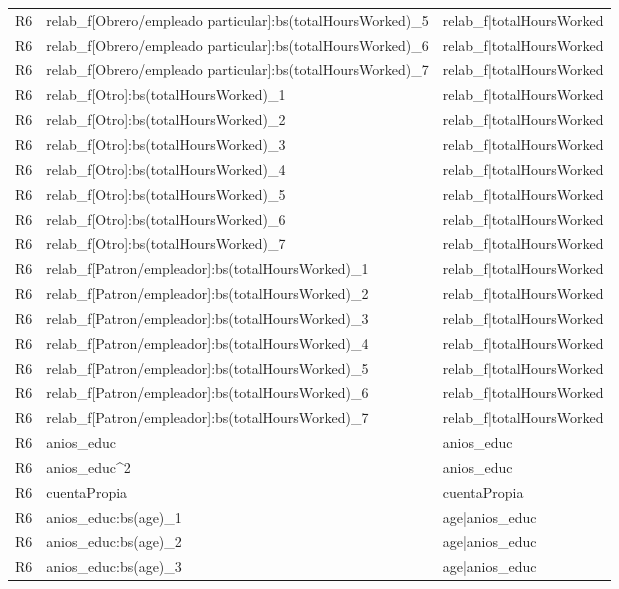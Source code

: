 \begin{longtable}{lll}
R6 & relab\_f[Obrero/empleado particular]:bs(totalHoursWorked)\_5 & relab\_f|totalHoursWorked \\
R6 & relab\_f[Obrero/empleado particular]:bs(totalHoursWorked)\_6 & relab\_f|totalHoursWorked \\
R6 & relab\_f[Obrero/empleado particular]:bs(totalHoursWorked)\_7 & relab\_f|totalHoursWorked \\
R6 & relab\_f[Otro]:bs(totalHoursWorked)\_1 & relab\_f|totalHoursWorked \\
R6 & relab\_f[Otro]:bs(totalHoursWorked)\_2 & relab\_f|totalHoursWorked \\
R6 & relab\_f[Otro]:bs(totalHoursWorked)\_3 & relab\_f|totalHoursWorked \\
R6 & relab\_f[Otro]:bs(totalHoursWorked)\_4 & relab\_f|totalHoursWorked \\
R6 & relab\_f[Otro]:bs(totalHoursWorked)\_5 & relab\_f|totalHoursWorked \\
R6 & relab\_f[Otro]:bs(totalHoursWorked)\_6 & relab\_f|totalHoursWorked \\
R6 & relab\_f[Otro]:bs(totalHoursWorked)\_7 & relab\_f|totalHoursWorked \\
R6 & relab\_f[Patron/empleador]:bs(totalHoursWorked)\_1 & relab\_f|totalHoursWorked \\
R6 & relab\_f[Patron/empleador]:bs(totalHoursWorked)\_2 & relab\_f|totalHoursWorked \\
R6 & relab\_f[Patron/empleador]:bs(totalHoursWorked)\_3 & relab\_f|totalHoursWorked \\
R6 & relab\_f[Patron/empleador]:bs(totalHoursWorked)\_4 & relab\_f|totalHoursWorked \\
R6 & relab\_f[Patron/empleador]:bs(totalHoursWorked)\_5 & relab\_f|totalHoursWorked \\
R6 & relab\_f[Patron/empleador]:bs(totalHoursWorked)\_6 & relab\_f|totalHoursWorked \\
R6 & relab\_f[Patron/empleador]:bs(totalHoursWorked)\_7 & relab\_f|totalHoursWorked \\
R6 & anios\_educ & anios\_educ \\
R6 & anios\_educ\textasciicircum 2 & anios\_educ \\
R6 & cuentaPropia & cuentaPropia \\
R6 & anios\_educ:bs(age)\_1 & age|anios\_educ \\
R6 & anios\_educ:bs(age)\_2 & age|anios\_educ \\
R6 & anios\_educ:bs(age)\_3 & age|anios\_educ \\

\end{longtable}
